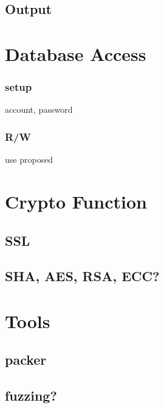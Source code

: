 \documentclass[12pt, a4paper]{article}
\begin{document}
\subsection{Output}

\section{Database Access}
\subsubsection{setup}
account, password

\subsubsection{R/W}
use proposed

\section{Crypto Function}
\subsection{SSL}
\subsection{SHA, AES, RSA, ECC?}

\section{Tools}
\subsection{packer}
\subsection{fuzzing?}



\end{document}
